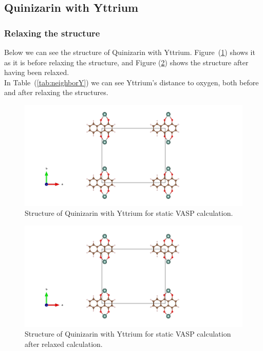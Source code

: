 \documentclass{article}
\begin{document}
      \vspace{1cm}

  \subsection{Quinizarin with Yttrium}

    \subsubsection{Relaxing the structure}

      Below we can see the structure of Quinizarin with Yttrium. Figure~(\ref{fig:Y_staticbefore_CONTCAR}) shows it as it is before relaxing the structure, and Figure (\ref{fig:Y_staticafter_CONTCAR}) shows the structure after having been relaxed. \\

      In Table~(\ref{tab:neighborY}) we can see Yttrium's distance to oxygen, both before and after relaxing the structures. \\

      \begin{figure}[H]
        \centering
        \includegraphics[width = \textwidth]{../fig/Y_staticbefore_CONTCAR.png}
        \caption{Structure of Quinizarin with Yttrium for static VASP calculation. }
        \label{fig:Y_staticbefore_CONTCAR}
      \end{figure}

      \begin{figure}[H]
        \centering
        \includegraphics[width = \textwidth]{../fig/Y_staticafter_CONTCAR.png}
        \caption{Structure of Quinizarin with Yttrium for static VASP   calculation after relaxed calculation. }
        \label{fig:Y_staticafter_CONTCAR}
      \end{figure}
\end{document}
